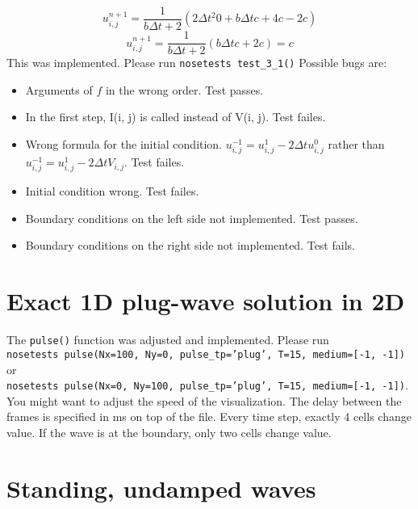 \documentclass{report}
\begin{document}
        $$
        u^{n+1}_{i,j} = \frac{1}{b \Delta t + 2} (2\Delta t^2 0 + b \Delta t c+4 c-2c )
        $$
        $$
        u^{n+1}_{i,j} = \frac{1}{b \Delta t + 2} (b \Delta t c+2 c)=c
        $$
        This was implemented. Please run \texttt{nosetests test\_3\_1()}
        \newpage
        Possible bugs are:
        \begin{itemize}
        \item Arguments of $f$ in the wrong order. Test passes.
        \item In the first step, I(i, j) is called instead of V(i, j). Test failes.
        \item Wrong formula for the initial condition. $u^{-1}_{i,j} = u^{1}_{i,j}-2 \Delta t u^{0}_{i,j}$ rather than $u^{-1}_{i,j} = u^{1}_{i,j}-2 \Delta t V_{i,j}$. Test failes.
        \item  Initial condition wrong. Test failes.
        \item  Boundary conditions on the left side not implemented. Test passes.
        \item  Boundary conditions on the right side not implemented. Test fails.
        \end{itemize}
        
        
        \section*{Exact 1D plug-wave solution in 2D}
        
        The \texttt{pulse()} function was adjusted and implemented. Please run\\
        \texttt{nosetests pulse(Nx=100, Ny=0, pulse\_tp='plug', T=15, medium=[-1, -1])} or\\ \texttt{nosetests pulse(Nx=0, Ny=100, pulse\_tp='plug', T=15, medium=[-1, -1])}.\\
        You might want to adjust the speed of the visualization. The delay between the frames is specified in ms on top of the file.
        Every time step, exactly 4 cells change value. If the wave is at the boundary, only two cells change value.
        
        
        \section*{Standing, undamped waves}
        
\end{document}
